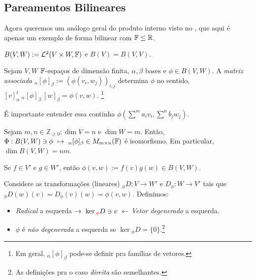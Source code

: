 \subsection{Pareamentos Bilineares}

Agora queremos um análogo geral do produto interno visto no \cite[Cap. 7]{MA719}, que aqui é apenas um exemplo de forma bilinear com \(\mathbb{F} \leq \mathbb{R}\). 

\begin{definition}
    \centering
    \(B(V,W) := \mathcal{L}^2(V\times W, \mathbb{F} )\) e \(B(V) = B(V,V)\). 
\end{definition}

\newcommand{\Fi}{_\alpha[\phi]_\beta}
\begin{definition}
    Sejam \(V, W \) \(\mathbb{F}\)-espaços de dimensão finita, \(\alpha, \beta\) bases e \(\phi \in B(V,W)\). A \emph{matriz associada} \(_\alpha[\phi]_\beta := (\phi(v_i,w_j))_{i,j}\) determina \(\phi\) no sentido, \([v]_\alpha^t\  _\alpha[\phi]_\beta \  [w]_\beta = \phi (v,w)\). \footnote{Em geral, \(\Fi\) pode-se definir pra famílias de vetores. } 
\end{definition}
\begin{note}
    É importante entender essa continha \(\phi\left(\sum^m a_i v_i, \sum^n b_j w_j\right)\).
\end{note} 
\begin{proposition}
    Sejam \(m,n \in \mathbb{Z}_{\geq 0}: \dim V = n\text{ e }  \dim W = m\). Então, \(\Phi: B(V,W) \ni \phi \ \mapsto\  \Fi \in M_{m\times n}(\F)\) é isomorfismo. Em particular, \(\dim B(V,W) = nm\). %
\end{proposition}


\begin{example}
    Se \(f \in V'\) e \(g \in W'\), então \(\phi(v,w):= f(v)g(w) \in B(V,W)\). 
\end{example}

\begin{definition}
    Considere as transformações (lineares) \(_\phi D : V \to W'\) e \(D_\phi: W \to V'\) tais que \(_\phi D (w)(v) = D_\phi (v)(w) = \phi(v,w)\). Definimos: 
    \begin{itemize}[label = \(\star\)]
        \item \emph{Radical} a esquerda \( \rightarrow \ \ker \textcolor{red}{_\phi} D  \ni v \ \leftarrow \) \emph{Vetor degenerado} a esquerda.  
        \item \(\phi\) é \emph{não degenerada} a esquerda se \(\ker {_\phi D} = \{0\}\).\footnote{As definições pra o caso \emph{direita} são semelhantes.}
    \end{itemize}
\end{definition}

